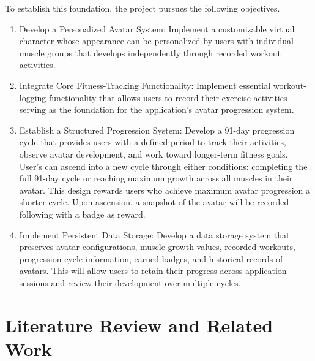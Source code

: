 \documentclass[11pt]{article}
\begin{document}
To establish this foundation, the project pursues the following objectives.
\begin{enumerate}
    \item Develop a Personalized Avatar System: Implement a customizable virtual
    character whose appearance can be personalized by users with individual muscle groups
    that develops independently through recorded workout activities.
    
    \item Integrate Core Fitness-Tracking Functionality: Implement essential
    workout-logging functionality that allows users to record their exercise
    activities serving as the foundation for the application's avatar progression system.

    \item Establish a Structured Progression System: Develop a 91-day progression
    cycle that provides users with a defined period to track their activities, observe
    avatar development, and work toward longer-term fitness goals. User's can ascend into a new cycle
    through either conditions: completing the full 91-day cycle or reaching maximum growth across all
    muscles in their avatar. This design rewards users who achieve maximum avatar progression a shorter cycle.
    Upon ascension, a snapshot of the avatar will be recorded following with a badge as reward.

    \item Implement Persistent Data Storage: Develop a data storage system that preserves avatar configurations, 
    muscle-growth values, recorded workouts, progression cycle information, earned badges, and historical
    records of avatars. This will allow users to retain their progress across application sessions and review their
    development over multiple cycles.

\end{enumerate}

\section{Literature Review and Related Work}
\end{document}
